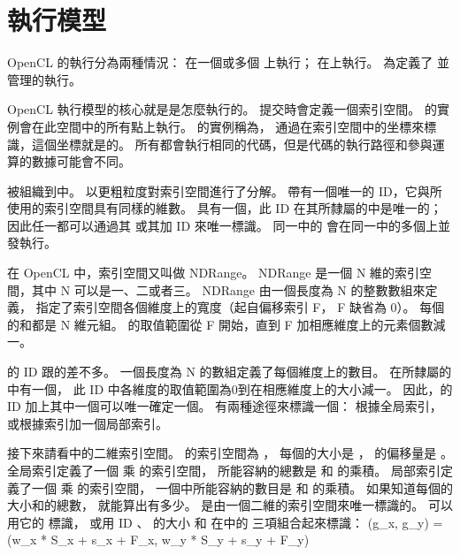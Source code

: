 
\section{執行模型}
OpenCL 的執行分為兩種情況：
在一個或多個 {} 上執行；
在上執行。
為定義了
並管理的執行。

OpenCL 執行模型的核心就是是怎麼執行的。
提交時會定義一個索引空間。
的實例會在此空間中的所有點上執行。
的實例稱為，
通過在索引空間中的坐標來標識，這個坐標就是的。
所有都會執行相同的代碼，但是代碼的執行路徑和參與運算的數據可能會不同。

被組織到中。
以更粗粒度對索引空間進行了分解。
帶有一個唯一的 ID，它與所使用的索引空間具有同樣的維數。
具有一個，此 ID 在其所隸屬的中是唯一的；
因此任一都可以通過其
或其加 ID 來唯一標識。
同一中的
會在同一中的多個上並發執行。

在 OpenCL 中，索引空間又叫做 NDRange。
 NDRange 是一個 N 維的索引空間，其中 N 可以是一、二或者三。
 NDRange 由一個長度為 N 的整數數組來定義，
指定了索引空間各個維度上的寬度（起自偏移索引 F， F 缺省為 0）。
每個的和都是 N 維元組。
的取值範圍從 F 開始，直到 F 加相應維度上的元素個數減一。

的 ID 跟的差不多。
一個長度為 N 的數組定義了每個維度上的數目。
在所隸屬的中有一個，
此 ID 中各維度的取值範圍為0到在相應維度上的大小減一。
因此，的 ID 加上其中一個可以唯一確定一個。
有兩種途徑來標識一個：
根據全局索引，或根據索引加一個局部索引。

接下來請看中的二維索引空間。
的索引空間為 ，
每個的大小是 ，
的偏移量是 。
全局索引定義了一個  乘  的索引空間，
所能容納的總數是  和  的乘積。
局部索引定義了一個  乘  的索引空間，
一個中所能容納的數目是  和  的乘積。
如果知道每個的大小和的總數，
就能算出有多少。
是由一個二維的索引空間來唯一標識的。
可以用它的  標識，
或用 ID 、
的大小  和
在中的  三項組合起來標識：
\startformula
(g_x, g_y) = (w_x * S_x + s_x + F_x, w_y * S_y + s_y + F_y)
\stopformula

